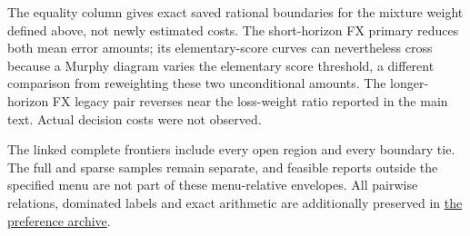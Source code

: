 The equality column gives exact saved rational boundaries for the mixture
weight defined above, not newly estimated costs. The short-horizon FX primary reduces both mean error amounts;
its elementary-score curves can nevertheless cross because a Murphy diagram
varies the elementary score threshold, a different comparison from reweighting
these two unconditional amounts. The longer-horizon FX legacy pair reverses
near the loss-weight ratio reported in the main text. Actual decision costs
were not observed.

The linked complete frontiers include every open region and every boundary tie.
The full and sparse samples remain separate, and feasible reports outside the
specified menu are not part of these menu-relative envelopes. All pairwise
relations, dominated labels and exact arithmetic are additionally preserved in
\href{https://github.com/ByronLi0207/financial-mathematics-paper-20261020/blob/revision-v7-final/results/revision-20261022/preference-robustness/README.md}{the preference archive}.